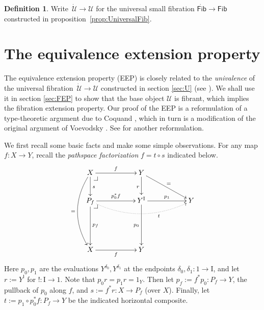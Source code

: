 \documentclass[12pt]{article}
\makeatletter
\newcommand{\pbcorner}[1][dr]{\save*!/#1-1.2pc/#1:(-1,1)@^{|-}\restore}
\newcommand{\ra}{\ensuremath{\rightarrow}}
\newcommand{\I}{\ensuremath{\mathrm{I}}}
\newcommand{\U}{\ensuremath{\mathcal{U}}}
\newcommand{\UU}{\ensuremath{\,\dot{\mathcal{U}}}}
\newcommand{\Fib}{\ensuremath{\mathsf{Fib}}}
\newcommand{\FFib}{\ensuremath{\dot{\mathsf{Fib}}}}
\theoremstyle{remark}
\theoremstyle{definition}
\newtheorem{definition}[theorem]{Definition}
\makeatother
\begin{document}
\begin{definition}\label{def:U}
Write $\UU \ra \U$ for the universal small fibration $\FFib\ra\Fib$ constructed in proposition~\ref{prop:UniversalFib}.
\end{definition}

\section{The equivalence extension property}\label{sec:EEP}

The equivalence extension property (EEP) is closely related to the \emph{univalence} of the universal fibration $\UU\ra\U$ constructed in section \ref{sec:U} (see \cite{Shu2015}).  We shall use it in section \ref{sec:FEP} to show that the base object $\U$ is fibrant, which implies the fibration extension property.  Our proof of the EEP is a reformulation of a type-theoretic argument due to Coquand \cite{CCHM}, which in turn is a modification of the original argument of Voevodsky \cite{KLV}.  See \cite{sattler} for another reformulation.

We first recall some basic facts and make some simple observations. For any map $f :X\ra Y$, recall the \emph{pathspace factorization} $f = t\circ s$ indicated below.
\begin{equation}\label{diag:pathspace factorization}
\xymatrix{
X \ar@/_1.5pc/[ddd]_= \ar[d]^s \ar[rr]^f \pbcorner && Y \ar[d]_r \ar[rrd]^=\\
P_f  \ar[dd]^{p_f} \ar[rr]^{p_0^*f} \ar@{.>}@/_1.5pc/[rrrr]_<<<<<<<<<<<<<<<t \pbcorner && Y^\I \ar[dd]_{p_0} \ar[rr]^-{p_1} && Y \\
\\
X \ar[rr]_f  &&  Y &
}
\end{equation}
Here $p_0, p_1$ are the evaluations $Y^{\delta_{0}}, Y^{\delta_{1}}$ at the endpoints $\delta_0, \delta_1 : 1\ra\I$, and let $r:= Y^!$ for $! : \I\ra 1$. Note that $p_0r = p_1r = 1_Y$.  Then let  $p_f := f^*p_0 : P_f \ra Y$, the pullback of $p_0$ along $f$, and $s:= f^*r : X\ra P_f$ (over $X$).  Finally, let $t:= p_1\circ p_0^*f : P_f \ra Y$ be the indicated horizontal composite. 
\end{document}
